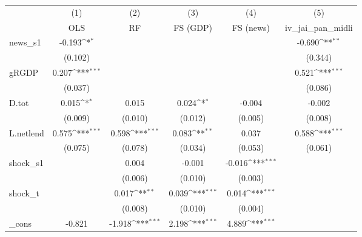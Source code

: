 {
\def\sym#1{\ifmmode^{#1}\else\(^{#1}\)\fi}
\begin{tabular}{l*{5}{c}}
\toprule
            &\multicolumn{1}{c}{(1)}&\multicolumn{1}{c}{(2)}&\multicolumn{1}{c}{(3)}&\multicolumn{1}{c}{(4)}&\multicolumn{1}{c}{(5)}\\
            &\multicolumn{1}{c}{OLS}&\multicolumn{1}{c}{RF}&\multicolumn{1}{c}{FS (GDP)}&\multicolumn{1}{c}{FS (news)}&\multicolumn{1}{c}{iv\_jai\_pan\_midli}\\
\midrule
news\_s1     &      -0.193\sym{*}  &                     &                     &                     &      -0.690\sym{**} \\
            &     (0.102)         &                     &                     &                     &     (0.344)         \\
\addlinespace
gRGDP       &       0.207\sym{***}&                     &                     &                     &       0.521\sym{***}\\
            &     (0.037)         &                     &                     &                     &     (0.086)         \\
\addlinespace
D.tot       &       0.015\sym{*}  &       0.015         &       0.024\sym{*}  &      -0.004         &      -0.002         \\
            &     (0.009)         &     (0.010)         &     (0.012)         &     (0.005)         &     (0.008)         \\
\addlinespace
L.netlend   &       0.575\sym{***}&       0.598\sym{***}&       0.083\sym{**} &       0.037         &       0.588\sym{***}\\
            &     (0.075)         &     (0.078)         &     (0.034)         &     (0.053)         &     (0.061)         \\
\addlinespace
shock\_s1    &                     &       0.004         &      -0.001         &      -0.016\sym{***}&                     \\
            &                     &     (0.006)         &     (0.010)         &     (0.003)         &                     \\
\addlinespace
shock\_t     &                     &       0.017\sym{**} &       0.039\sym{***}&       0.014\sym{***}&                     \\
            &                     &     (0.008)         &     (0.010)         &     (0.004)         &                     \\
\addlinespace
\_cons      &      -0.821         &      -1.918\sym{***}&       2.198\sym{***}&       4.889\sym{***}&                     \\

\end{tabular}}

